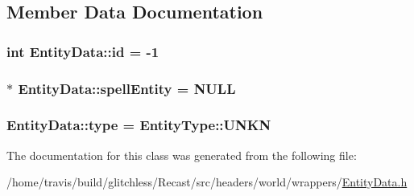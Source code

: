 \subsection{Member Data Documentation}
\hypertarget{class_entity_data_a49d6424bb8ad0b6c6008a54d26ff7b93}{
\subsubsection[{id}]{\setlength{\rightskip}{0pt plus 5cm}int Entity\-Data\-::id = -\/1}}\label{class_entity_data_a49d6424bb8ad0b6c6008a54d26ff7b93}
\hypertarget{class_entity_data_a5c2ab0f4236334b63ebd90800aa07e03}{
\subsubsection[{spell\-Entity}]{$\ast$ Entity\-Data\-::spell\-Entity = N\-U\-L\-L}}\label{class_entity_data_a5c2ab0f4236334b63ebd90800aa07e03}
\hypertarget{class_entity_data_ac1f27faa5c0699cc2e084c92f3cf8c46}{
\subsubsection[{type}]{ Entity\-Data\-::type = {\bf Entity\-Type\-::\-U\-N\-K\-N}}}\label{class_entity_data_ac1f27faa5c0699cc2e084c92f3cf8c46}


The documentation for this class was generated from the following file\-:\begin{DoxyCompactItemize}
\item 
/home/travis/build/glitchless/\-Recast/src/headers/world/wrappers/\hyperlink{_entity_data_8h}{Entity\-Data.\-h}\end{DoxyCompactItemize}
